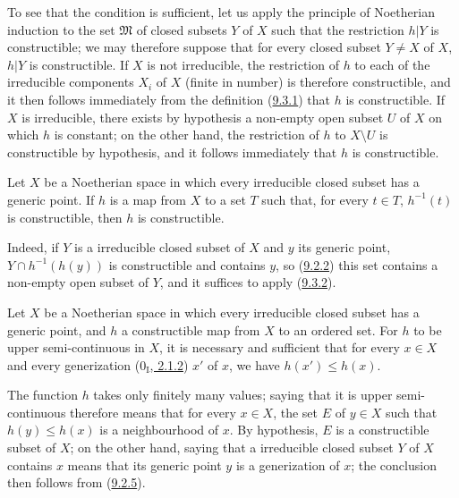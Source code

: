 To see that the condition is sufficient, let us apply the principle of
Noetherian induction to the set $\mathfrak{M}$ of closed subsets $Y$
of $X$ such that the restriction $h|Y$ is constructible; we may therefore
suppose that for every closed subset $Y\ne X$ of $X$, $h|Y$ is
constructible. If $X$ is not irreducible, the restriction of $h$ to
each of the irreducible components $X_i$ of $X$ (finite in number) is therefore
constructible, and it then follows immediately from the definition
(\hyperref[0.9.3.1]{9.3.1}) that $h$ is constructible. If $X$ is
irreducible, there exists by hypothesis a non-empty open subset $U$ of $X$
on which $h$ is constant; on the other hand, the restriction of $h$ to
$X\setminus U$ is constructible by hypothesis, and it follows immediately
that $h$ is constructible.

\begin{corollary}[9.3.3]
\label{0.9.3.3}
Let $X$ be a Noetherian space in which every irreducible closed subset
has a generic point. If $h$ is a map from $X$ to a set
$T$ such that, for every $t\in T$, $h^{-1}(t)$ is constructible, then $h$
is constructible.
\end{corollary}

Indeed, if $Y$ is a irreducible closed subset of $X$ and $y$ its generic
point, $Y\cap h^{-1}(h(y))$ is constructible and contains $y$, so
(\hyperref[0.9.2.2]{9.2.2}) this set contains a non-empty open subset of
$Y$, and it suffices to apply (\hyperref[0.9.3.2]{9.3.2}).

\begin{proposition}[9.3.4]
\label{0.9.3.4}
Let $X$ be a Noetherian space in which every irreducible closed subset
has a generic point, and $h$ a constructible map from $X$ to an
ordered set. For $h$ to be upper semi-continuous in $X$,
it is necessary and sufficient that for every $x\in X$ and every generization
(\hyperref[0.2.1.2]{$0_{\mathrm I}$, 2.1.2}) $x'$ of $x$, we have
$h(x')\leq h(x)$.
\end{proposition}

The function $h$ takes only finitely many values; saying that it is
upper semi-continuous therefore means that for every $x\in X$,
the set $E$ of $y\in X$ such that $h(y)\leq h(x)$ is a neighbourhood of $x$.
By hypothesis, $E$ is a constructible subset of $X$; on the other hand, saying
that a irreducible closed subset $Y$ of $X$ contains $x$ means that its
generic point $y$ is a generization of $x$; the conclusion then follows
from (\hyperref[0.9.2.5]{9.2.5}).

